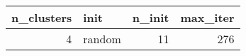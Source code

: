 \begin{tabular}{rlrr}
\toprule
n_clusters & init & n_init & max_iter \\
\midrule
4 & random & 11 & 276 \\
\bottomrule
\end{tabular}

